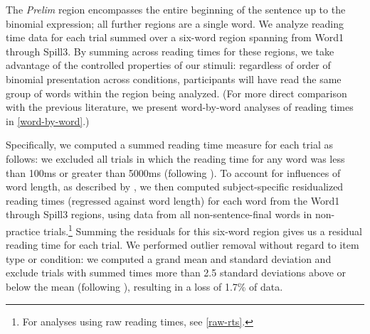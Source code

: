 \documentclass[authoryear]{elsarticle}
\begin{document}
\noindent The \emph{Prelim} region encompasses the entire beginning of the sentence up to the binomial expression; all further regions are a single word. We analyze reading time data for each trial summed over a six-word region spanning from Word1 through Spill3. By summing across reading times for these regions, we take advantage of the controlled properties of our stimuli: regardless of order of binomial presentation across conditions, participants will have read the same group of words within the region being analyzed. (For more direct comparison with the previous literature, we present word-by-word analyses of reading times in \ref{word-by-word}.)

Specifically, we computed a summed reading time measure for each trial as follows: we excluded all trials in which the reading time for any word was less than 100ms or greater than 5000ms (following \citealp{Fine:2013vt}). To account for influences of word length, as described by \citet{Ferreira:1986vz}, we then computed subject-specific residualized reading times (regressed against word length) for each word from the Word1 through Spill3 regions, using data from all non-sentence-final words in non-practice trials.\footnote{For analyses using raw reading times, see \ref{raw-rts}.} Summing the residuals for this six-word region gives us a residual reading time for each trial. We performed outlier removal without regard to item type or condition: we computed a grand mean and standard deviation and exclude trials with summed times more than 2.5 standard deviations above or below the mean (following \citealp{Garnsey:1997vo}), resulting in a loss of 1.7\% of data.
\end{document}
